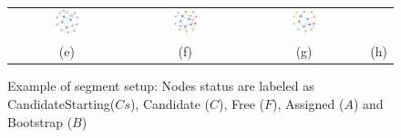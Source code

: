 \begin{figure}
\begin{tabular}{cccc}
\includegraphics[width=0.23\textwidth]{pictures/seq06.eps} &
\includegraphics[width=0.23\textwidth]{pictures/seq07.eps} & 
\includegraphics[width=0.23\textwidth]{pictures/seq08.eps} \\
(e) & (f) & (g) & (h) \\
\end{tabular}
\caption{Example of \disr{} segment setup: Nodes status are labeled as CandidateStarting($Cs$), Candidate ($C$), Free ($F$), Assigned ($A$) and Bootstrap ($B$)}
\label{fig:disr_events}
\end{figure}

